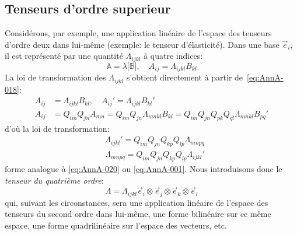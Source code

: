 \subsection{Tenseurs d'ordre superieur}
Considérons, par exemple, une application linéaire de l'espace des tenseurs d'ordre deux dans lui-même (exemple: le tenseur d'élasticité).
Dans une base $\vec{e}_i$, il est représenté par une quantité $\Lambda_{ijkl}$ à quatre indices:
\begin{equation}
    \mathbb{A} = \lambda \bigl[ \mathbb{B} \bigr], \quad A_{ij} = \Lambda_{ijkl} B_{kl}
    \label{eq:AnnA-025}
\end{equation}
La loi de transformation des $\Lambda_{ijkl}$ s'obtient directement à partir de~\eqref{eq:AnnA-018}:
\begin{align*}
    A_{ij}& = \Lambda_{ijkl} B_{kl}, \quad A_{ij}' = \Lambda_{ijkl} B_{kl}'\\
        A_{ij} &= Q_{im} Q_{jn} A_{mn} = Q_{im} Q_{jn} \Lambda_{mnkl} B_{kl}= Q_{im} Q_{jn} Q_{pk} Q_{ql} \Lambda_{mnkl} B_{pq}'
    \end{align*}
d'où la loi de transformation:
\begin{equation}
    \begin{aligned}
        &\Lambda_{ijkl}' = Q_{im} Q_{jn} Q_{kp} Q_{lp} \Lambda_{mnpq}\\
        &\Lambda_{mnpq} = Q_{im} Q_{jn} Q_{kp} Q_{lp} \Lambda_{ijkl}'
    \end{aligned}
    \label{eq:AnnA-026}
\end{equation}
forme analogue à \eqref{eq:AnnA-020} ou \eqref{eq:AnnA-001}.
Nous introduisons donc le \emph{tenseur du quatrième ordre}:
\begin{equation}
    \Lambda = \Lambda_{ijkl} \vec{e}_i \otimes \vec{e}_j \otimes \vec{e}_k \otimes \vec{e}_l
    \label{eq:AnnA-027}
\end{equation}
qui, suivant les circonstances, sera une application linéaire de l'espace des tenseurs du second ordre dans lui-même, une forme bilinéaire sur ce même espace, une forme quadrilinéaire sur l'espace des vecteurs, etc.
